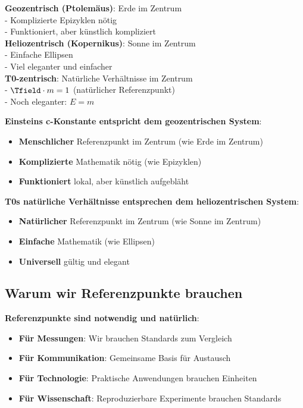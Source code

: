 	\begin{tcolorbox}[colback=blue!5!white,colframe=blue!75!black,title=Die Referenzpunkt-Revolution: Von Erde $\rightarrow$ Sonne $\rightarrow$ Natur]
		\textbf{Geozentrisch (Ptolemäus)}: Erde im Zentrum \\
		- Komplizierte Epizyklen nötig \\
		- Funktioniert, aber künstlich kompliziert \\
		
		\textbf{Heliozentrisch (Kopernikus)}: Sonne im Zentrum \\
		- Einfache Ellipsen \\
		- Viel eleganter und einfacher \\
		
		\textbf{T0-zentrisch}: Natürliche Verhältnisse im Zentrum \\
		- $\Tfield \cdot m = 1$ (natürlicher Referenzpunkt) \\
		- Noch eleganter: $E = m$
	\end{tcolorbox}
	
	\textbf{Einsteins c-Konstante entspricht dem geozentrischen System}:
	\begin{itemize}
		\item \textbf{Menschlicher} Referenzpunkt im Zentrum (wie Erde im Zentrum)
		\item \textbf{Komplizierte} Mathematik nötig (wie Epizyklen)
		\item \textbf{Funktioniert} lokal, aber künstlich aufgebläht
	\end{itemize}
	
	\textbf{T0s natürliche Verhältnisse entsprechen dem heliozentrischen System}:
	\begin{itemize}
		\item \textbf{Natürlicher} Referenzpunkt im Zentrum (wie Sonne im Zentrum)
		\item \textbf{Einfache} Mathematik (wie Ellipsen)
		\item \textbf{Universell} gültig und elegant
	\end{itemize}
	
	\subsection{Warum wir Referenzpunkte brauchen}
	
	\textbf{Referenzpunkte sind notwendig und natürlich}:
	\begin{itemize}
		\item \textbf{Für Messungen}: Wir brauchen Standards zum Vergleich
		\item \textbf{Für Kommunikation}: Gemeinsame Basis für Austausch
		\item \textbf{Für Technologie}: Praktische Anwendungen brauchen Einheiten
		\item \textbf{Für Wissenschaft}: Reproduzierbare Experimente brauchen Standards
	\end{itemize}
	
